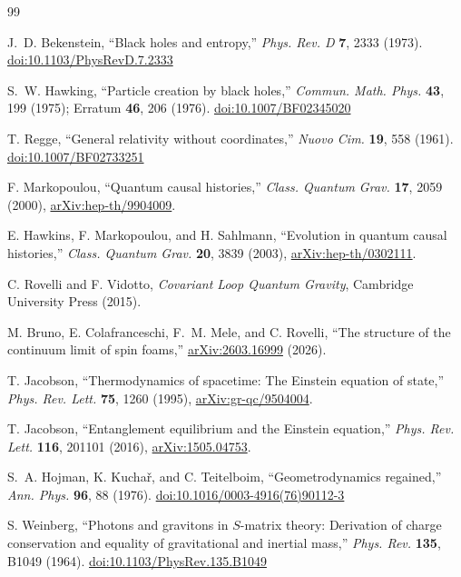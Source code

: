 \documentclass[11pt]{article}
\theoremstyle{remark}
\newcommand{\doi}[1]{\href{https://doi.org/#1}{doi:#1}}
\begin{document}
\begin{thebibliography}{99}

J.~D. Bekenstein,
``Black holes and entropy,''
\emph{Phys. Rev. D} \textbf{7}, 2333 (1973).
\doi{10.1103/PhysRevD.7.2333}

S.~W. Hawking,
``Particle creation by black holes,''
\emph{Commun. Math. Phys.} \textbf{43}, 199 (1975);
Erratum \textbf{46}, 206 (1976).
\doi{10.1007/BF02345020}

T. Regge,
``General relativity without coordinates,''
\emph{Nuovo Cim.} \textbf{19}, 558 (1961).
\doi{10.1007/BF02733251}

F. Markopoulou,
``Quantum causal histories,''
\emph{Class. Quantum Grav.} \textbf{17}, 2059 (2000),
\href{https://arxiv.org/abs/hep-th/9904009}{arXiv:hep-th/9904009}.

E. Hawkins, F. Markopoulou, and H. Sahlmann,
``Evolution in quantum causal histories,''
\emph{Class. Quantum Grav.} \textbf{20}, 3839 (2003),
\href{https://arxiv.org/abs/hep-th/0302111}{arXiv:hep-th/0302111}.

C. Rovelli and F. Vidotto,
\emph{Covariant Loop Quantum Gravity},
Cambridge University Press (2015).

M. Bruno, E. Colafranceschi, F.~M. Mele, and C. Rovelli,
``The structure of the continuum limit of spin foams,''
\href{https://arxiv.org/abs/2603.16999}{arXiv:2603.16999} (2026).

T. Jacobson,
``Thermodynamics of spacetime: The Einstein equation of state,''
\emph{Phys. Rev. Lett.} \textbf{75}, 1260 (1995),
\href{https://arxiv.org/abs/gr-qc/9504004}{arXiv:gr-qc/9504004}.

T. Jacobson,
``Entanglement equilibrium and the Einstein equation,''
\emph{Phys. Rev. Lett.} \textbf{116}, 201101 (2016),
\href{https://arxiv.org/abs/1505.04753}{arXiv:1505.04753}.

S.~A. Hojman, K. Kucha\v{r}, and C. Teitelboim,
``Geometrodynamics regained,''
\emph{Ann. Phys.} \textbf{96}, 88 (1976).
\doi{10.1016/0003-4916(76)90112-3}

S. Weinberg,
``Photons and gravitons in \(S\)-matrix theory: Derivation of charge
conservation and equality of gravitational and inertial mass,''
\emph{Phys. Rev.} \textbf{135}, B1049 (1964).
\doi{10.1103/PhysRev.135.B1049}


\end{thebibliography}
\end{document}
